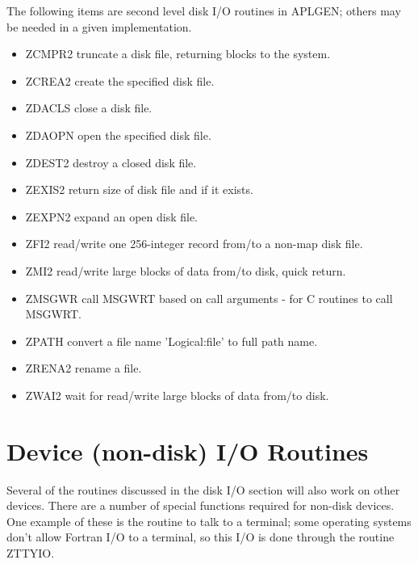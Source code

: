 The following items are second level disk I/O routines in APLGEN;
others may be needed in a given implementation.
\begin{itemize} %
\item ZCMPR2  truncate a disk file, returning blocks to
the system.
\item ZCREA2  create the specified disk file.
\item ZDACLS  close a disk file.
\item ZDAOPN  open the specified disk file.
\item ZDEST2  destroy a closed disk file.
\item ZEXIS2  return size of disk file and if  it
exists.
\item ZEXPN2  expand an open disk file.
\item ZFI2    read/write one 256-integer record from/to a
non-map disk file.
\item ZMI2    read/write large blocks of data from/to
disk, quick return.
\item ZMSGWR  call MSGWRT based on call arguments - for
C routines to call MSGWRT.
\item ZPATH   convert a file name 'Logical:file' to full
path name.
\item ZRENA2  rename a file.
\item ZWAI2   wait for read/write large blocks of data
from/to disk.
\end{itemize} %


\section{Device (non-disk) I/O Routines }

Several of the routines discussed in the disk I/O section will also work
on other devices.  There are a number of special functions required
for non-disk devices.  One example of these is the routine to talk to
a terminal; some operating systems don't allow Fortran I/O to a
terminal, so this I/O is done through the routine ZTTYIO.

